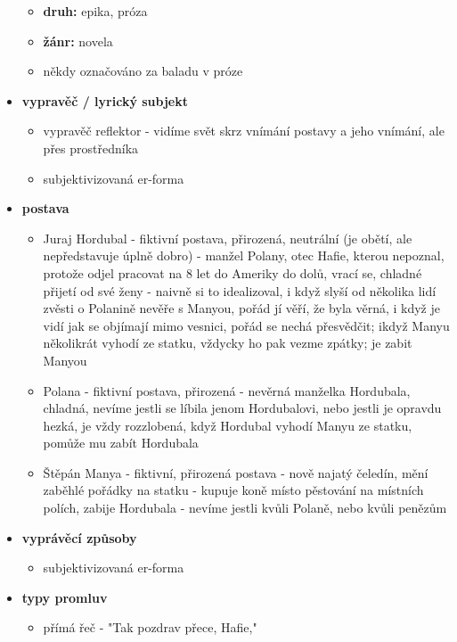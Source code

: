 \documentclass[11pt]{article}
\begin{document}
\begin{itemize}
        \begin{itemize}
            \item\textbf{druh: }epika, próza
            \item\textbf{žánr: }novela
            \item někdy označováno za baladu v próze
        \end{itemize}
        \item\textbf{vypravěč / lyrický subjekt}
        \begin{itemize}
            \item vypravěč reflektor - vidíme svět skrz vnímání postavy a jeho vnímání, ale přes prostředníka
            \item subjektivizovaná er-forma
        \end{itemize}
        \item\textbf{postava}
        \begin{itemize}
            \item Juraj Hordubal - fiktivní postava, přirozená, neutrální (je obětí, ale nepředstavuje úplně dobro) - manžel Polany, otec Hafie, kterou nepoznal, protože odjel pracovat na 8 let do Ameriky do dolů, vrací se, chladné přijetí od své ženy - naivně si to idealizoval, i když slyší od několika lidí zvěsti o Polanině nevěře s Manyou, pořád jí věří, že byla věrná, i když je vidí jak se objímají mimo vesnici, pořád se nechá přesvědčit; ikdyž Manyu několikrát vyhodí ze statku, vždycky ho pak vezme zpátky; je zabit Manyou
            \item Polana - fiktivní postava, přirozená - nevěrná manželka Hordubala, chladná, nevíme jestli se líbila jenom Hordubalovi, nebo jestli je opravdu hezká, je vždy rozzlobená, když Hordubal vyhodí Manyu ze statku, pomůže mu zabít Hordubala
            \item Štěpán Manya - fiktivní, přirozená postava - nově najatý čeledín, mění zaběhlé pořádky na statku - kupuje koně místo pěstování na místních polích, zabije Hordubala - nevíme jestli kvůli Polaně, nebo kvůli penězům
        \end{itemize}
        \item\textbf{vyprávěcí způsoby}
        \begin{itemize}
            \item subjektivizovaná er-forma
        \end{itemize}
        \item\textbf{typy promluv}
        \begin{itemize}
            \item přímá řeč - "Tak pozdrav přece, Hafie,"

\end{itemize}
\end{itemize}
\end{document}
